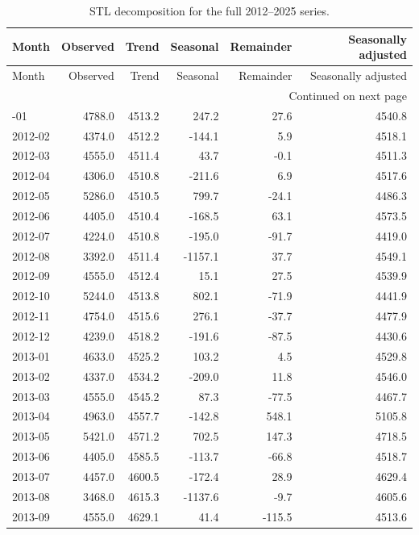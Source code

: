 \begingroup
\scriptsize
\setlength{\tabcolsep}{3pt}
\begin{longtable}{lrrrrr}
\caption{STL decomposition for the full 2012--2025 series.}\label{tab:stl_full}\\
\toprule
Month & Observed & Trend & Seasonal & Remainder & Seasonally adjusted \\ 
\midrule
\endfirsthead
\toprule
Month & Observed & Trend & Seasonal & Remainder & Seasonally adjusted \\ 
\midrule
\endhead
\midrule\multicolumn{6}{r}{Continued on next page}\\
\endfoot
\bottomrule
\endlastfoot
2012-01 & 4788.0 & 4513.2 & 247.2 & 27.6 & 4540.8 \\ 
2012-02 & 4374.0 & 4512.2 & -144.1 & 5.9 & 4518.1 \\ 
2012-03 & 4555.0 & 4511.4 & 43.7 & -0.1 & 4511.3 \\ 
2012-04 & 4306.0 & 4510.8 & -211.6 & 6.9 & 4517.6 \\ 
2012-05 & 5286.0 & 4510.5 & 799.7 & -24.1 & 4486.3 \\ 
2012-06 & 4405.0 & 4510.4 & -168.5 & 63.1 & 4573.5 \\ 
2012-07 & 4224.0 & 4510.8 & -195.0 & -91.7 & 4419.0 \\ 
2012-08 & 3392.0 & 4511.4 & -1157.1 & 37.7 & 4549.1 \\ 
2012-09 & 4555.0 & 4512.4 & 15.1 & 27.5 & 4539.9 \\ 
2012-10 & 5244.0 & 4513.8 & 802.1 & -71.9 & 4441.9 \\ 
2012-11 & 4754.0 & 4515.6 & 276.1 & -37.7 & 4477.9 \\ 
2012-12 & 4239.0 & 4518.2 & -191.6 & -87.5 & 4430.6 \\ 
2013-01 & 4633.0 & 4525.2 & 103.2 & 4.5 & 4529.8 \\ 
2013-02 & 4337.0 & 4534.2 & -209.0 & 11.8 & 4546.0 \\ 
2013-03 & 4555.0 & 4545.2 & 87.3 & -77.5 & 4467.7 \\ 
2013-04 & 4963.0 & 4557.7 & -142.8 & 548.1 & 5105.8 \\ 
2013-05 & 5421.0 & 4571.2 & 702.5 & 147.3 & 4718.5 \\ 
2013-06 & 4405.0 & 4585.5 & -113.7 & -66.8 & 4518.7 \\ 
2013-07 & 4457.0 & 4600.5 & -172.4 & 28.9 & 4629.4 \\ 
2013-08 & 3468.0 & 4615.3 & -1137.6 & -9.7 & 4605.6 \\ 
2013-09 & 4555.0 & 4629.1 & 41.4 & -115.5 & 4513.6 \\ 

\end{longtable}
